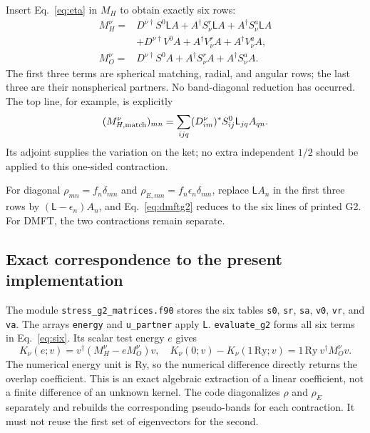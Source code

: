 \documentclass[11pt]{article}
\begin{document}
Insert Eq.~\eqref{eq:eta} in $M_H$ to obtain exactly six rows:
\begin{equation}\label{eq:six}
 \boxed{\begin{aligned}
 M_H^\nu={}&D^{\nu\dagger}S^0\mathsf L A
          +A^\dagger S^r_\nu\mathsf L A
          +A^\dagger S^a_\nu\mathsf L A\\
          &+D^{\nu\dagger}V^0A
          +A^\dagger V^r_\nu A
          +A^\dagger V^a_\nu A,\\
 M_O^\nu={}&D^{\nu\dagger}S^0 A
          +A^\dagger S^r_\nu A
          +A^\dagger S^a_\nu A .
 \end{aligned}}
\end{equation}
The first three terms are spherical matching, radial, and angular rows; the last three are their nonspherical partners. No band-diagonal reduction has occurred. The top line, for example, is explicitly
\begin{equation}
 (M_{H,\rm match}^\nu)_{mn}=\sum_{ijq}(D_{im}^\nu)^*S^0_{ij}\mathsf L_{jq}A_{qn}.
\end{equation}
Its adjoint supplies the variation on the ket; no extra independent $1/2$ should be applied to this one-sided contraction.

For diagonal $\rho_{mn}=f_n\delta_{mn}$ and $\rho_{E,mn}=f_n\epsilon_n\delta_{mn}$, replace $\mathsf L A_n$ in the first three rows by $(\mathsf L-\epsilon_n)A_n$, and Eq.~\eqref{eq:dmftg2} reduces to the six lines of printed G2. For DMFT, the two contractions remain separate.

\subsection{Exact correspondence to the present implementation}
The module \nolinkurl{stress_g2_matrices.f90} stores the six tables \texttt{s0}, \texttt{sr}, \texttt{sa}, \texttt{v0}, \texttt{vr}, and \texttt{va}. The arrays \texttt{energy} and \texttt{u\_partner} apply $\mathsf L$. \texttt{evaluate\_g2} forms all six terms in Eq.~\eqref{eq:six}. Its scalar test energy $e$ gives
\begin{equation}
 K_\nu(e;v)=v^\dagger(M_H^\nu-eM_O^\nu)v,\quad
 K_\nu(0;v)-K_\nu(1\,\mathrm{Ry};v)=1\,\mathrm{Ry}\ v^\dagger M_O^\nu v.
\end{equation}
The numerical energy unit is Ry, so the numerical difference directly returns the overlap coefficient. This is an exact algebraic extraction of a linear coefficient, not a finite difference of an unknown kernel. The code diagonalizes $\rho$ and $\rho_E$ separately and rebuilds the corresponding pseudo-bands for each contraction. It must not reuse the first set of eigenvectors for the second.
\end{document}
